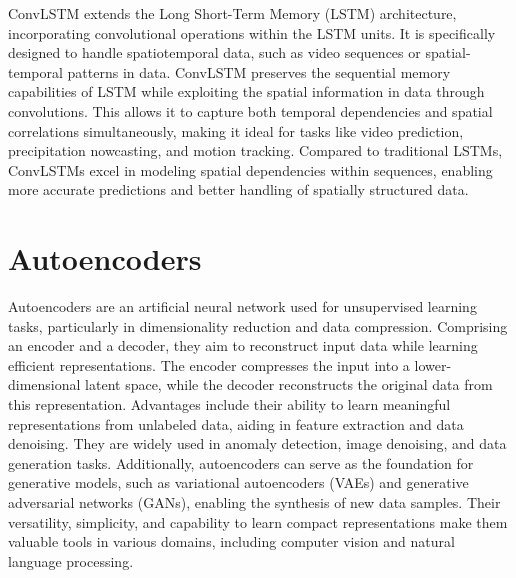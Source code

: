 ConvLSTM extends the Long Short-Term Memory (LSTM) architecture, incorporating convolutional operations within the LSTM units. It is specifically designed to handle spatiotemporal data, such as video sequences or spatial-temporal patterns in data. ConvLSTM preserves the sequential memory capabilities of LSTM while exploiting the spatial information in data through convolutions. This allows it to capture both temporal dependencies and spatial correlations simultaneously, making it ideal for tasks like video prediction, precipitation nowcasting, and motion tracking. Compared to traditional LSTMs, ConvLSTMs excel in modeling spatial dependencies within sequences, enabling more accurate predictions and better handling of spatially structured data.

\section{Autoencoders}
\label{sec:Autoencoders} 

Autoencoders are an artificial neural network used for unsupervised learning tasks, particularly in dimensionality reduction and data compression. Comprising an encoder and a decoder, they aim to reconstruct input data while learning efficient representations. The encoder compresses the input into a lower-dimensional latent space, while the decoder reconstructs the original data from this representation. Advantages include their ability to learn meaningful representations from unlabeled data, aiding in feature extraction and data denoising. They are widely used in anomaly detection, image denoising, and data generation tasks. Additionally, autoencoders can serve as the foundation for generative models, such as variational autoencoders (VAEs) and generative adversarial networks (GANs), enabling the synthesis of new data samples. Their versatility, simplicity, and capability to learn compact representations make them valuable tools in various domains, including computer vision and natural language processing.

